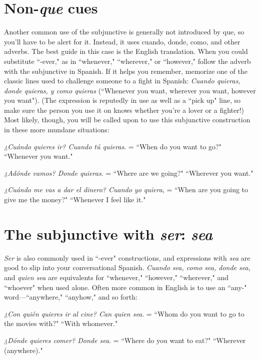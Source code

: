 \section{Non-\emph{que} cues}

Another common use of the subjunctive is generally not introduced by que, so you'll have to be alert for it. Instead, it uses cuando,
donde, como, and other adverbs. The best guide in this case is the English translation. When you could substitute ``-ever," as in ``whenever," ``wherever," or ``however," follow the adverb with the subjunctive
in Spanish. If it helps you remember, memorize one of the classic
lines used to challenge someone to a fight in Spanish: \emph{Cuando quieras,
donde quieras, y como quieras} (``Whenever you want, wherever you
want, however you want"). (The expression is reputedly in use as well
as a ``pick up" line, so make sure the person you use it on knows
whether you're a lover or a fighter!) Most likely, though, you will be
called upon to use this subjunctive construction in these more mundane situations:

\bsk

\indu \emph{¿Cuándo quieres ir? Cuando tú quieras}. = ``When do you
want to go?" ``Whenever you want."

\indu \emph{¿Adónde vamos? Donde quieras}. = ``Where are we going?"
``Wherever you want."

\indu \emph{¿Cuándo me vas a dar el dinero? Cuando yo quiera}, = ``When
are you going to give me the money?" ``Whenever I
feel like it."

\section{The subjunctive with \emph{ser}: \emph{sea}}

\emph{Ser} is also commonly used in ``-ever" constructions, and expressions with \emph{sea} are good to slip into your conversational Spanish.
\emph{Cuando sea, como sea, donde sea}, and \emph{quien sea} are equivalents for
``whenever," ``however," ``wherever," and ``whoever" when used alone.
Often more common in English is to use an ``any-" word---``anywhere," ``anyhow," and so forth:

\bsk

\indu \emph{¿Con quién quieres ir al cine? Can quien sea}. = ``Whom
do you want to go to the movies with?" ``With
whomever."

\indu \emph{¿Dónde quieres comer? Donde sea}. = ``Where do you want to
eat?" ``Wherever (anywhere)."

